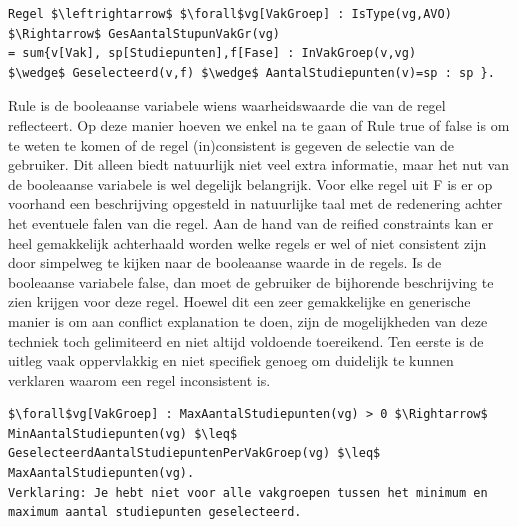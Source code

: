 \begin{lstlisting}[mathescape, caption=IDP Reified Constraint Example, frame=single]
Regel $\leftrightarrow$ $\forall$vg[VakGroep] : IsType(vg,AVO) $\Rightarrow$ GesAantalStupunVakGr(vg) 
= sum{v[Vak], sp[Studiepunten],f[Fase] : InVakGroep(v,vg) 
$\wedge$ Geselecteerd(v,f) $\wedge$ AantalStudiepunten(v)=sp : sp }.
\end{lstlisting}
Rule is de booleaanse variabele wiens waarheidswaarde die van de regel reflecteert. Op deze manier hoeven we enkel na te gaan of Rule true of false is om te weten te komen of de regel (in)consistent is gegeven de selectie van de gebruiker. Dit alleen biedt natuurlijk niet veel extra informatie, maar het nut van de booleaanse variabele is wel degelijk belangrijk. Voor elke regel uit F is er op voorhand een beschrijving opgesteld in natuurlijke taal met de redenering achter het eventuele falen van die regel. Aan de hand van de reified constraints kan er heel gemakkelijk achterhaald worden welke regels er wel of niet consistent zijn door simpelweg te kijken naar de booleaanse waarde in de regels. Is de booleaanse variabele false, dan moet de gebruiker de bijhorende beschrijving te zien krijgen voor deze regel. Hoewel dit een zeer gemakkelijke en generische manier is om aan conflict explanation te doen, zijn de mogelijkheden van deze techniek toch gelimiteerd en niet altijd voldoende toereikend. Ten eerste is de uitleg vaak oppervlakkig en niet specifiek genoeg om duidelijk te kunnen verklaren waarom een regel inconsistent is. 
\begin{lstlisting}[mathescape, caption=Reified constraint Shortcomings, frame=single]
$\forall$vg[VakGroep] : MaxAantalStudiepunten(vg) > 0 $\Rightarrow$ 
MinAantalStudiepunten(vg) $\leq$ GeselecteerdAantalStudiepuntenPerVakGroep(vg) $\leq$ MaxAantalStudiepunten(vg).
Verklaring: Je hebt niet voor alle vakgroepen tussen het minimum en maximum aantal studiepunten geselecteerd.
\end{lstlisting}
